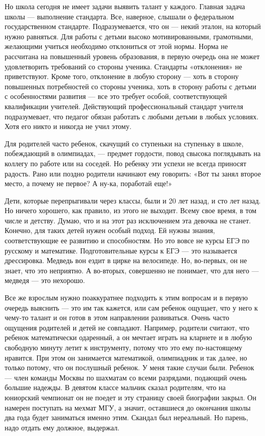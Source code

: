 Но школа сегодня не имеет задачи выявить талант у каждого. Главная задача школы --- выполнение стандарта. Все, наверное, слышали о федеральном государственном стандарте. Подразумевается, что он --- некий эталон, на который нужно равняться.
Для работы с детьми высоко мотивированными, грамотными, желающими учиться необходимо отклониться от этой нормы. Норма не рассчитана на повышенный уровень образования, в первую очередь она не может удовлетворить требований со стороны ученика. Стандарты «отклонения» не приветствуют. Кроме того, отклонение в любую сторону --- хоть в сторону повышенных потребностей со стороны ученика, хоть в сторону работы с детьми с особенностями развития --- все это требует особой, соответствующей квалификации учителей. Действующий профессиональный стандарт учителя подразумевает, что педагог обязан работать с любыми детьми в любых условиях. Хотя его никто и никогда не учил этому.

\begin{fancyquotes}
    Для родителей часто ребенок, скачущий со ступеньки на ступеньку в школе, побеждающий в олимпиадах, --- предмет гордости, повод свысока поглядывать на коллегу по работе или на соседей. Но ребенку эти успехи не всегда приносят радость. Рано или поздно родители начинают ему говорить: «Вот ты занял второе место, а почему не первое? А ну-ка, поработай еще!»
\end{fancyquotes}

Дети, которые перепрыгивали через классы, были и 20 лет назад, и сто лет назад. Но ничего хорошего, как правило, из этого не выходит. Всему свое время, в том числе и детству. Думаю, что и на этот раз исключением эта девочка не станет. Конечно, для таких детей нужен особый подход. Ей нужны знания, соответствующие ее развитию и способностям. Но это вовсе не курсы ЕГЭ по русскому и математике. Подготовительные курсы к ЕГЭ --- это называется дрессировка. Медведь вон ездит в цирке на велосипеде. Но, во-первых, он не знает, что это неприятно. А во-вторых, совершенно не понимает, что для него --- медведя --- это нехорошо.

Все же взрослым нужно поаккуратнее подходить к этим вопросам и в первую очередь выяснить --- это им так кажется, или сам ребенок ощущает, что у него к чему-то талант и он готов в этом направлении развиваться. Очень часто ощущения родителей и детей не совпадают. Например, родители считают, что ребенок математически одаренный, а он мечтает играть на кларнете и в любую свободную минуту летит к инструменту, потому что это ему по-настоящему нравится. При этом он занимается математикой, олимпиадник и так далее, но только потому, что он послушный ребенок. У меня такие случаи были. Ребенок --- член команды Москвы по шахматам со всеми разрядами, подающий очень большие надежды. В девятом классе мальчик сказал родителям, что на юниорский чемпионат он не поедет и эту страницу своей биографии закрыл. Он намерен поступать на мехмат МГУ, а значит, оставшиеся до окончания школы два года будет заниматься именно этим. Скандал был нереальный. Но парень, надо отдать ему должное, выдержал.


